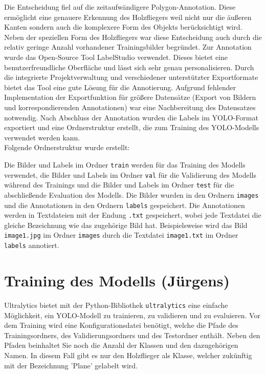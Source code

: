 Die Entscheidung fiel auf die zeitaufwändigere Polygon-Annotation. Diese ermöglicht eine genauere Erkennung des Holzfliegers weil nicht nur die äußeren Kanten sondern auch die komplexere Form des Objekts berücksichtigt wird. 
Neben der speziellen Form des Holzfliegers war diese Entscheidung auch durch die relativ geringe Anzahl vorhandener Trainingsbilder begründet. 
Zur Annotation wurde das Open-Source Tool LabelStudio verwendet. Dieses bietet eine benutzerfreundliche Oberfläche und lässt sich sehr genau personalisieren. Durch die integrierte Projektverwaltung und verschiedener unterstützter Exportformate bietet das Tool eine gute Lösung für die Annotierung.
Aufgrund fehlender Implementation der Exportfunktion für größere Datensätze (Export von Bildern und korrespondierenden Annotationen) war eine Nachbereitung des Datensatzes notwendig. Nach Abschluss der Annotation wurden die Labels im YOLO-Format exportiert und eine Ordnerstruktur erstellt, die zum Training des YOLO-Modells verwendet werden kann.
\\ Folgende Ordnerstruktur wurde erstellt: \\ 


\newpage
Die Bilder und Labels im Ordner \texttt{train} werden für das Training des Modells verwendet, die Bilder und Labels im Ordner \texttt{val} für die Validierung des Modells während des Trainings und die Bilder und Labels im Ordner \texttt{test} für die abschließende Evaluation des Modells.
Die Bilder wurden in den Ordnern \texttt{images} und die Annotationen in den Ordnern \texttt{labels} gespeichert. Die Annotationen werden in Textdateien mit der Endung \texttt{.txt} gespeichert, wobei jede Textdatei die gleiche Bezeichnung wie das zugehörige Bild hat. Beispielsweise wird das Bild \texttt{image1.jpg} im Ordner \texttt{images} durch die Textdatei \texttt{image1.txt} im Ordner \texttt{labels} annotiert.


\section{Training des Modells (Jürgens)}
Ultralytics bietet mit der Python-Bibliothek \texttt{ultralytics} eine einfache Möglichkeit, ein YOLO-Modell zu trainieren, zu validieren und zu evaluieren. Vor dem Training wird eine Konfigurationsdatei benötigt, welche die Pfade des Trainingsordners, des Validierungsordners und des Testordner enthält. Neben den Pfaden beinhaltet Sie noch die Anzahl der Klassen und den dazugehörigen Namen. In diesem Fall gibt es nur den Holzflieger als Klasse, welcher zukünftig mit der Bezeichnung 'Plane' gelabelt wird. 
\\


